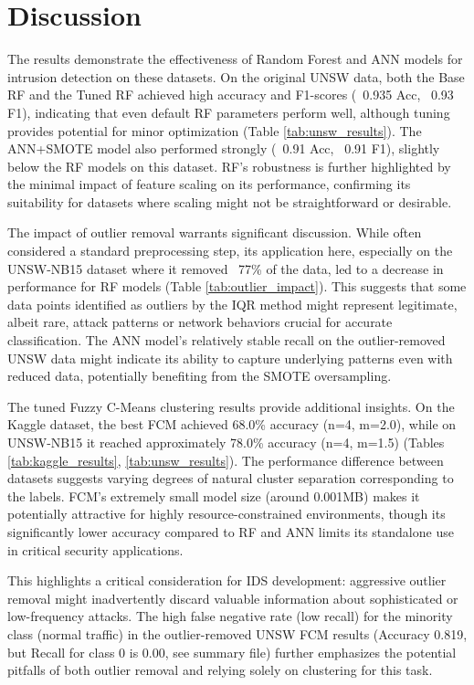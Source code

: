 \documentclass[sigconf,screen,final,nonacm]{acmart}
\begin{document}
\section{Discussion}
The results demonstrate the effectiveness of Random Forest and ANN models for intrusion detection on these datasets. On the original UNSW data, both the Base RF and the Tuned RF achieved high accuracy and F1-scores (~0.935 Acc, ~0.93 F1), indicating that even default RF parameters perform well, although tuning provides potential for minor optimization (Table \ref{tab:unsw_results}). The ANN+SMOTE model also performed strongly (~0.91 Acc, ~0.91 F1), slightly below the RF models on this dataset. RF's robustness is further highlighted by the minimal impact of feature scaling on its performance, confirming its suitability for datasets where scaling might not be straightforward or desirable.

The impact of outlier removal warrants significant discussion. While often considered a standard preprocessing step, its application here, especially on the UNSW-NB15 dataset where it removed ~77\% of the data, led to a decrease in performance for RF models (Table \ref{tab:outlier_impact}). This suggests that some data points identified as outliers by the IQR method might represent legitimate, albeit rare, attack patterns or network behaviors crucial for accurate classification. The ANN model's relatively stable recall on the outlier-removed UNSW data might indicate its ability to capture underlying patterns even with reduced data, potentially benefiting from the SMOTE oversampling.

The tuned Fuzzy C-Means clustering results provide additional insights. On the Kaggle dataset, the best FCM achieved 68.0\% accuracy (n=4, m=2.0), while on UNSW-NB15 it reached approximately 78.0\% accuracy (n=4, m=1.5) (Tables \ref{tab:kaggle_results}, \ref{tab:unsw_results}). The performance difference between datasets suggests varying degrees of natural cluster separation corresponding to the labels. FCM's extremely small model size (around 0.001MB) makes it potentially attractive for highly resource-constrained environments, though its significantly lower accuracy compared to RF and ANN limits its standalone use in critical security applications.

This highlights a critical consideration for IDS development: aggressive outlier removal might inadvertently discard valuable information about sophisticated or low-frequency attacks. The high false negative rate (low recall) for the minority class (normal traffic) in the outlier-removed UNSW FCM results (Accuracy 0.819, but Recall for class 0 is 0.00, see summary file) further emphasizes the potential pitfalls of both outlier removal and relying solely on clustering for this task.
\end{document}
